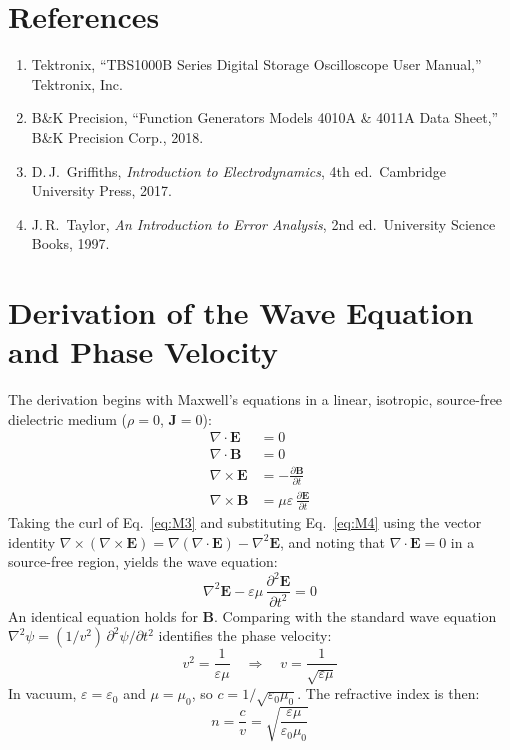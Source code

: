 \documentclass[12pt]{article}
\begin{document}
\section*{References}

\begin{enumerate}
\item Tektronix, ``TBS1000B Series Digital Storage Oscilloscope User Manual,'' Tektronix, Inc.
\item B\&K Precision, ``Function Generators Models 4010A \& 4011A Data Sheet,'' B\&K Precision Corp., 2018.
\item D.\,J.\ Griffiths, \textit{Introduction to Electrodynamics}, 4th ed.\ Cambridge University Press, 2017.
\item J.\,R.\ Taylor, \textit{An Introduction to Error Analysis}, 2nd ed.\ University Science Books, 1997.
\end{enumerate}

\newpage

\appendix
\section{Derivation of the Wave Equation and Phase Velocity}

The derivation begins with Maxwell's equations in a linear, isotropic, source-free dielectric medium ($\rho = 0$, $\mathbf{J} = 0$):
\begin{align}
\nabla \cdot \mathbf{E} &= 0 \label{eq:M1}\\
\nabla \cdot \mathbf{B} &= 0 \label{eq:M2}\\
\nabla \times \mathbf{E} &= -\frac{\partial \mathbf{B}}{\partial t} \label{eq:M3}\\
\nabla \times \mathbf{B} &= \mu\varepsilon\,\frac{\partial \mathbf{E}}{\partial t} \label{eq:M4}
\end{align}
Taking the curl of Eq.~\eqref{eq:M3} and substituting Eq.~\eqref{eq:M4} using the vector identity $\nabla \times (\nabla \times \mathbf{E}) = \nabla(\nabla \cdot \mathbf{E}) - \nabla^2 \mathbf{E}$, and noting that $\nabla \cdot \mathbf{E} = 0$ in a source-free region, yields the wave equation:
\begin{equation}
\nabla^2 \mathbf{E} - \varepsilon\mu\,\frac{\partial^2 \mathbf{E}}{\partial t^2} = 0
\label{eq:wave_app}
\end{equation}
An identical equation holds for $\mathbf{B}$. Comparing with the standard wave equation $\nabla^2 \psi = (1/v^2)\,\partial^2\psi/\partial t^2$ identifies the phase velocity:
\begin{equation}
v^2 = \frac{1}{\varepsilon\mu} \quad\Longrightarrow\quad v = \frac{1}{\sqrt{\varepsilon\mu}}
\label{eq:v_phase}
\end{equation}
In vacuum, $\varepsilon = \varepsilon_0$ and $\mu = \mu_0$, so $c = 1/\sqrt{\varepsilon_0 \mu_0}$. The refractive index is then:
\begin{equation}
n = \frac{c}{v} = \sqrt{\frac{\varepsilon\mu}{\varepsilon_0\mu_0}}
\label{eq:n_derived}
\end{equation}
\end{document}
